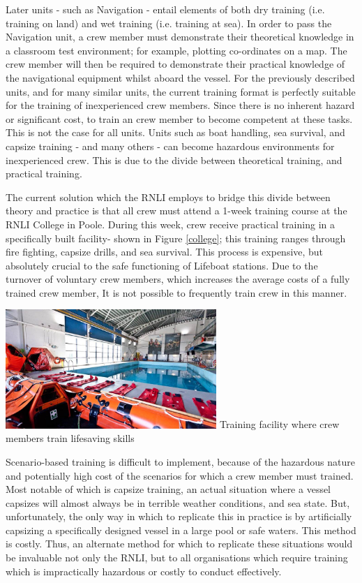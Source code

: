 \documentclass[ %
                    author={Elis Jones},
                supervisor={Dr. Kirsten Cater},
                    degree={BSc},
                     title={The Effect of Presentation Medium on Spatial Cognition},
                  subtitle={in the Virtual Environment},
                      year={2018} ]{dissertation}
\begin{document}
Later units - such as Navigation - entail elements of both dry training (i.e. training on land) and wet training (i.e. training at sea). In order to pass the Navigation unit, a crew member must demonstrate their theoretical knowledge in a classroom test environment; for example, plotting co-ordinates on a map. The crew member will then be required to demonstrate their practical knowledge of the navigational equipment whilst aboard the vessel. 
For the previously described units, and for many similar units, the current training format is perfectly suitable for the training of inexperienced crew members. Since there is no inherent hazard or significant cost, to train an crew member to become competent at these tasks. This is not the case for all units. Units such as boat handling, sea survival, and capsize training - and many others - can become hazardous environments for inexperienced crew. This is due to the divide between theoretical training, and practical training. 

The current solution which the RNLI employs to bridge this divide between theory and practice is that all crew must attend a 1-week training course at the RNLI College in Poole. During this week, crew receive practical training in a specifically built facility- shown in Figure \ref{college}; this training ranges through fire fighting, capsize drills, and sea survival. This process is expensive, but absolutely crucial to the safe functioning of Lifeboat stations. Due to the turnover of voluntary crew members, which increases the average costs of a fully trained crew member, It is not possible to frequently train crew in this manner. 

\begin{minipage}{\textwidth}
\centering
\includegraphics[width=0.6\textwidth]{images/rnli_college.jpg}
 {Training facility where crew members train lifesaving skills}
\label{college}
\hfill \break
\end{minipage}


Scenario-based training is difficult to implement, because of the hazardous nature and potentially high cost of the scenarios for which a crew member must trained. Most notable of which is capsize training, an actual situation where a vessel capsizes will almost always be in terrible weather conditions, and sea state. But, unfortunately, the only way in which to replicate this in practice is by artificially capsizing a specifically designed vessel in a large pool or safe waters. This method is costly. Thus, an alternate method for which to replicate these situations would be invaluable not only the RNLI, but to all organisations which require training which is impractically hazardous or costly to conduct effectively.
\end{document}
